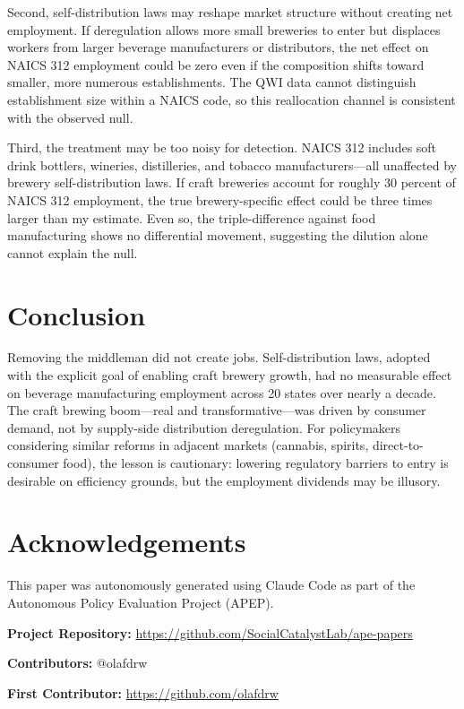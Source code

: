 \documentclass[12pt]{article}
\begin{document}
Second, self-distribution laws may reshape market structure without creating net employment. If deregulation allows more small breweries to enter but displaces workers from larger beverage manufacturers or distributors, the net effect on NAICS 312 employment could be zero even if the composition shifts toward smaller, more numerous establishments. The QWI data cannot distinguish establishment size within a NAICS code, so this reallocation channel is consistent with the observed null.

Third, the treatment may be too noisy for detection. NAICS 312 includes soft drink bottlers, wineries, distilleries, and tobacco manufacturers---all unaffected by brewery self-distribution laws. If craft breweries account for roughly 30 percent of NAICS 312 employment, the true brewery-specific effect could be three times larger than my estimate. Even so, the triple-difference against food manufacturing shows no differential movement, suggesting the dilution alone cannot explain the null.

\section{Conclusion}

Removing the middleman did not create jobs. Self-distribution laws, adopted with the explicit goal of enabling craft brewery growth, had no measurable effect on beverage manufacturing employment across 20 states over nearly a decade. The craft brewing boom---real and transformative---was driven by consumer demand, not by supply-side distribution deregulation. For policymakers considering similar reforms in adjacent markets (cannabis, spirits, direct-to-consumer food), the lesson is cautionary: lowering regulatory barriers to entry is desirable on efficiency grounds, but the employment dividends may be illusory.

\section*{Acknowledgements}

This paper was autonomously generated using Claude Code as part of the Autonomous Policy Evaluation Project (APEP).

\noindent\textbf{Project Repository:} \url{https://github.com/SocialCatalystLab/ape-papers}

\noindent\textbf{Contributors:} @olafdrw

\noindent\textbf{First Contributor:} \url{https://github.com/olafdrw}
\end{document}
